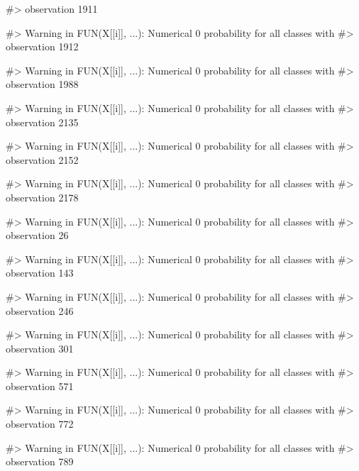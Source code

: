 \begin{Schunk}
\begin{Soutput}
#> observation 1911
\end{Soutput}
\begin{Soutput}
#> Warning in FUN(X[[i]], ...): Numerical 0 probability for all classes with
#> observation 1912
\end{Soutput}
\begin{Soutput}
#> Warning in FUN(X[[i]], ...): Numerical 0 probability for all classes with
#> observation 1988
\end{Soutput}
\begin{Soutput}
#> Warning in FUN(X[[i]], ...): Numerical 0 probability for all classes with
#> observation 2135
\end{Soutput}
\begin{Soutput}
#> Warning in FUN(X[[i]], ...): Numerical 0 probability for all classes with
#> observation 2152
\end{Soutput}
\begin{Soutput}
#> Warning in FUN(X[[i]], ...): Numerical 0 probability for all classes with
#> observation 2178
\end{Soutput}
\begin{Soutput}
#> Warning in FUN(X[[i]], ...): Numerical 0 probability for all classes with
#> observation 26
\end{Soutput}
\begin{Soutput}
#> Warning in FUN(X[[i]], ...): Numerical 0 probability for all classes with
#> observation 143
\end{Soutput}
\begin{Soutput}
#> Warning in FUN(X[[i]], ...): Numerical 0 probability for all classes with
#> observation 246
\end{Soutput}
\begin{Soutput}
#> Warning in FUN(X[[i]], ...): Numerical 0 probability for all classes with
#> observation 301
\end{Soutput}
\begin{Soutput}
#> Warning in FUN(X[[i]], ...): Numerical 0 probability for all classes with
#> observation 571
\end{Soutput}
\begin{Soutput}
#> Warning in FUN(X[[i]], ...): Numerical 0 probability for all classes with
#> observation 772
\end{Soutput}
\begin{Soutput}
#> Warning in FUN(X[[i]], ...): Numerical 0 probability for all classes with
#> observation 789
\end{Soutput}
\begin{Soutput}

\end{Soutput}
\end{Schunk}
